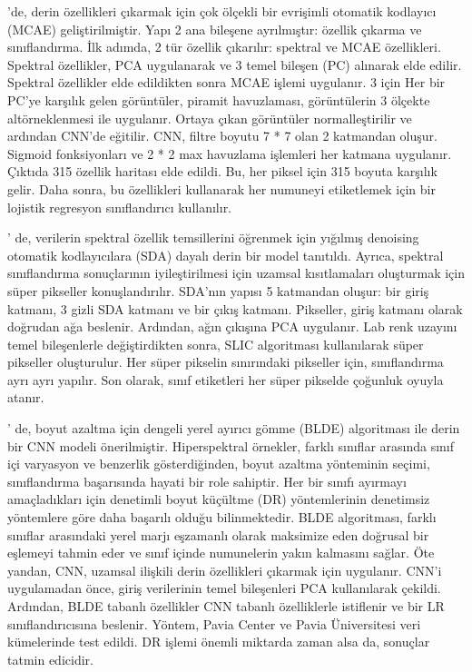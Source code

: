 \citep{zhao2015combining}'de, derin özellikleri çıkarmak için çok ölçekli bir evrişimli otomatik kodlayıcı (MCAE) geliştirilmiştir.
Yapı 2 ana bileşene ayrılmıştır: özellik çıkarma ve sınıflandırma. İlk adımda, 2 tür özellik çıkarılır: spektral ve MCAE özellikleri. Spektral özellikler, PCA uygulanarak ve 3 temel bileşen (PC) alınarak elde edilir. Spektral özellikler elde edildikten sonra MCAE işlemi uygulanır. 3 için
Her bir PC'ye karşılık gelen görüntüler, piramit havuzlaması, görüntülerin 3 ölçekte altörneklenmesi ile uygulanır. Ortaya çıkan görüntüler normalleştirilir ve ardından CNN'de eğitilir.
CNN, filtre boyutu 7 * 7 olan 2 katmandan oluşur. Sigmoid fonksiyonları ve 2 * 2 max havuzlama işlemleri her katmana uygulanır. Çıktıda 315 özellik haritası elde edildi. Bu, her piksel için 315 boyuta karşılık gelir. Daha sonra, bu özellikleri kullanarak her numuneyi etiketlemek için bir lojistik regresyon sınıflandırıcı kullanılır.

\citep{liu2015hyperspectral}' de, verilerin spektral özellik temsillerini öğrenmek için yığılmış denoising otomatik kodlayıcılara (SDA) dayalı derin bir model tanıtıldı. Ayrıca, spektral sınıflandırma sonuçlarının iyileştirilmesi için uzamsal kısıtlamaları oluşturmak için süper pikseller konuşlandırılır.
SDA'nın yapısı 5 katmandan oluşur: bir giriş katmanı, 3 gizli SDA katmanı ve bir çıkış katmanı. Pikseller, giriş katmanı olarak doğrudan ağa beslenir.
Ardından, ağın çıkışına PCA uygulanır. Lab renk uzayını temel bileşenlerle değiştirdikten sonra, SLIC algoritması kullanılarak süper pikseller oluşturulur.
Her süper pikselin sınırındaki pikseller için, sınıflandırma ayrı ayrı yapılır.
Son olarak, sınıf etiketleri her süper pikselde çoğunluk oyuyla atanır.

\citep{zhao2016spectral}' de,  boyut azaltma için dengeli yerel ayırıcı gömme (BLDE) algoritması ile derin bir CNN modeli önerilmiştir.
Hiperspektral örnekler, farklı sınıflar arasında sınıf içi varyasyon ve benzerlik gösterdiğinden, boyut azaltma yönteminin seçimi, sınıflandırma başarısında hayati bir role sahiptir.
Her bir sınıfı ayırmayı amaçladıkları için denetimli boyut küçültme (DR) yöntemlerinin denetimsiz yöntemlere göre daha başarılı olduğu bilinmektedir. BLDE algoritması, farklı sınıflar arasındaki yerel marjı eşzamanlı olarak maksimize eden doğrusal bir eşlemeyi tahmin eder ve sınıf içinde numunelerin yakın kalmasını sağlar. Öte yandan, CNN, uzamsal ilişkili derin özellikleri çıkarmak için uygulanır. CNN'i uygulamadan önce, giriş verilerinin temel bileşenleri  PCA kullanılarak çekildi. Ardından, BLDE tabanlı özellikler CNN tabanlı özelliklerle istiflenir ve bir LR sınıflandırıcısına beslenir. Yöntem, Pavia Center ve Pavia Üniversitesi veri kümelerinde test edildi. DR işlemi önemli miktarda zaman alsa da, sonuçlar tatmin edicidir.

